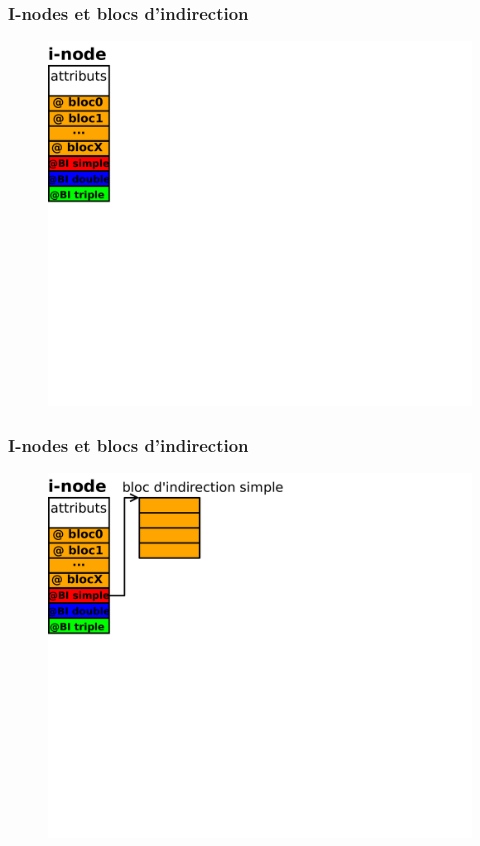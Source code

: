 \begin{frame}
  \frametitle{I-nodes et blocs d'indirection}
  \begin{figure}
    \includegraphics[width=0.9\linewidth]{fig4/inode1}
  \end{figure}
\end{frame}
\begin{frame}
  \frametitle{I-nodes et blocs d'indirection}
  \begin{figure}
    \includegraphics[width=0.9\linewidth]{fig4/inode2}
  \end{figure}
\end{frame}
